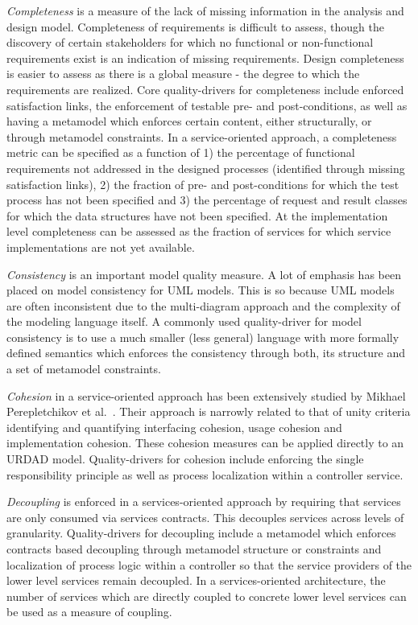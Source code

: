 \emph{Completeness} is a measure of the lack of missing information in the analysis and design model. Completeness of requirements is difficult to assess, though the discovery of certain stakeholders for which no functional or non-functional requirements exist is an indication of missing requirements. Design completeness is easier to assess as there is a global measure - the degree to which the requirements are realized. Core quality-drivers for completeness include enforced satisfaction links, the enforcement of testable pre- and post-conditions, as well as having a metamodel which enforces certain content, either structurally, or through metamodel constraints. In a service-oriented approach, a completeness metric can be specified as a function of 1) the percentage of functional requirements not addressed in the designed processes (identified through missing satisfaction links)\cite{shim_design_2008}, 2) the fraction of pre- and post-conditions for which the test process has not been specified and 3) the percentage of request and result classes for which the data structures have not been specified. At the implementation level completeness can be assessed as the fraction of services for which service implementations are not yet available.

\emph{Consistency} is an important model quality measure. A lot of emphasis has been placed on model consistency for UML models. This is so because UML models are often inconsistent due to the multi-diagram approach and the complexity of the modeling language itself\cite{}. A commonly used quality-driver for model consistency is to use a much smaller (less general) language with more formally defined semantics which enforces the consistency through both, its structure and a set of metamodel constraints.

\emph{Cohesion} in a service-oriented approach has been extensively studied by Mikhael Perepletchikov et al.\ \cite{perepletchikov_cohesion_2007,perepletchikov_impact_2010}. Their approach is narrowly related to that of unity criteria \cite{gonzalez_unity_2009} identifying and quantifying interfacing cohesion, usage cohesion and implementation cohesion. These cohesion measures can be applied directly to an URDAD model. Quality-drivers for cohesion include enforcing the single responsibility principle as well as process localization within a controller service. 

\emph{Decoupling} is enforced in a services-oriented approach by requiring that services are only consumed via services contracts. This decouples services across levels of granularity. Quality-drivers for decoupling include a metamodel which enforces contracts based decoupling through metamodel structure or constraints and localization of process logic within a controller so that the service providers of the lower level services remain decoupled. In a services-oriented architecture, the number of services which are directly coupled to concrete lower level services can be used as a measure of coupling\cite{shim_design_2008}.

